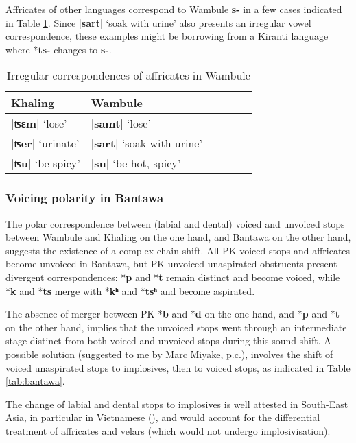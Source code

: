 \documentclass[oneside,a4paper,11pt]{article}
\newcommand{\ipa}[1]{\textbf{{\phon\mbox{#1}}}} %
\newcommand{\dhatu}[2]{|\ipa{#1}| `#2'}
\begin{document}
Affricates of other languages correspond to Wambule \ipa{s-} in a few cases indicated in Table \ref{tab:affricates.wambule}. Since \dhatu{sart}{soak with urine} also presents an irregular vowel correspondence, these examples might  be borrowing from a Kiranti language where *\ipa{ts-} changes to \ipa{s-}.

\begin{table}[H]
\caption{Irregular correspondences of affricates in Wambule} \centering \label{tab:affricates.wambule}
\begin{tabular}{llllll}
\toprule
Khaling & Wambule \\
\midrule
\dhatu{ʦɛm}{lose} & \dhatu{samt}{lose}\\
\dhatu{ʦer}{urinate} & \dhatu{sart}{soak with urine} \\
\dhatu{ʦu}{be spicy} & \dhatu{su}{be hot, spicy}\\
\bottomrule
\end{tabular}
\end{table}

\subsubsection{Voicing polarity in Bantawa} \label{sec:polarity}
The polar correspondence between (labial and dental) voiced and unvoiced stops between Wambule and Khaling on the one hand, and Bantawa on the other hand, suggests the existence of a complex chain shift. All PK voiced stops and affricates become unvoiced in Bantawa, but PK unvoiced unaspirated obstruents  present divergent correspondences: *\ipa{p} and *\ipa{t} remain distinct and become voiced, while *\ipa{k} and *\ipa{ts} merge with *\ipa{kʰ} and *\ipa{tsʰ} and become aspirated.

The absence of merger between PK *\ipa{b} and *\ipa{d} on the one hand, and *\ipa{p} and *\ipa{t} on the other hand, implies that the unvoiced stops went through an intermediate stage distinct from both voiced and unvoiced stops during this sound shift. A possible solution (suggested to me by Marc Miyake, p.c.), involves the shift of voiced unaspirated stops to implosives, then to voiced stops, as indicated in Table \ref{tab:bantawa}.

The change of labial and dental stops to implosives is well attested in South-East Asia, in particular in Vietnamese (\citealt{ferlus82spirantisation}), and would account for the differential treatment of affricates and velars (which would not undergo implosivisation). 
\end{document}

